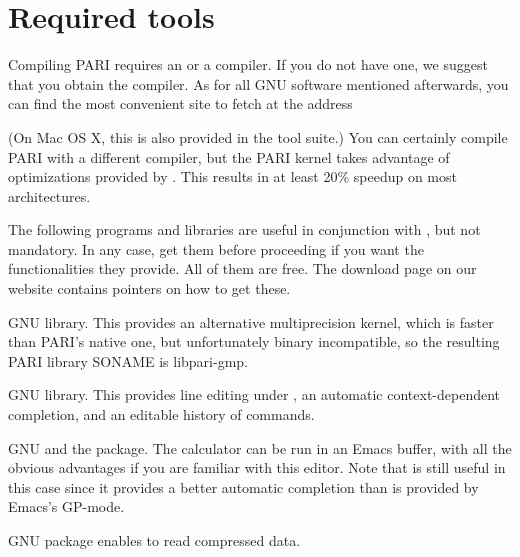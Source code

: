 %
%

\def\tocwrite#1{}
\section{Required tools}

Compiling PARI requires an  or a  compiler. If you do
not have one, we suggest that you obtain the  compiler. As for
all GNU software mentioned afterwards, you can find the most convenient site
to fetch  at the address


\noindent (On Mac OS X, this is also provided in the  tool
suite.) You can certainly compile PARI with a different compiler, but
the PARI kernel takes advantage of optimizations provided by .
This results in at least 20\% speedup on most architectures.

 The following programs and libraries are useful
in conjunction with , but not mandatory. In any case, get them before
proceeding if you want the functionalities they provide. All of them are free.
The download page on our website
 contains pointers on how
to get these.

  \item GNU  library. This provides an alternative multiprecision
kernel, which is faster than PARI's native one, but unfortunately binary
incompatible, so the resulting PARI library SONAME is libpari-gmp.

  \item GNU  library. This provides line editing under
, an automatic context-dependent completion, and an editable history
of commands.

  \item GNU  and the  package. The 
calculator can be run in an Emacs buffer, with all the obvious advantages if
you are familiar with this editor. Note that  is still useful
in this case since it provides a better automatic completion than is provided
by Emacs's GP-mode.

  \item GNU  package enables  to read
compressed data.

